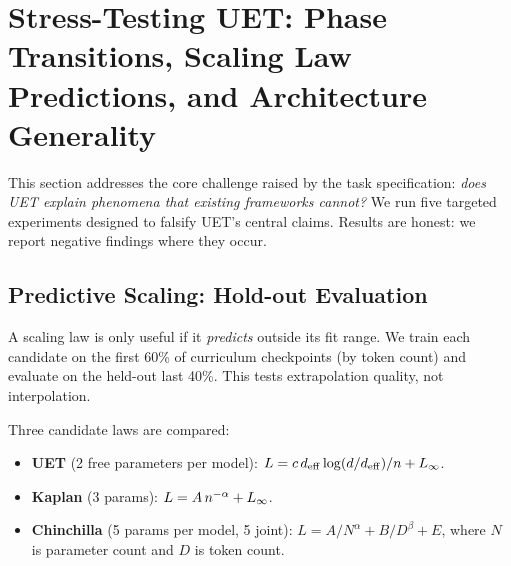 \section{Stress-Testing UET: Phase Transitions, Scaling Law Predictions, and Architecture Generality}
\label{sec:v3}

This section addresses the core challenge raised by the task specification:
\emph{does UET explain phenomena that existing frameworks cannot?}
We run five targeted experiments designed to falsify UET's central claims.
Results are honest: we report negative findings where they occur.

\subsection{Predictive Scaling: Hold-out Evaluation}
\label{sec:predictive}

A scaling law is only useful if it \emph{predicts} outside its fit range.
We train each candidate on the first 60\% of curriculum checkpoints
(by token count) and evaluate on the held-out last 40\%.
This tests extrapolation quality, not interpolation.

Three candidate laws are compared:

\begin{itemize}[leftmargin=1.5em,itemsep=2pt]
\item \textbf{UET} (2 free parameters per model):
  $L = c\,d_{\mathrm{eff}}\log(d/d_{\mathrm{eff}})/n + L_{\infty}$.
\item \textbf{Kaplan} \citep{kaplan2020scaling} (3 params):
  $L = A\,n^{-\alpha} + L_{\infty}$.
\item \textbf{Chinchilla} \citep{hoffmann2022chinchilla} (5 params per model, 5 joint):
  $L = A/N^{\alpha} + B/D^{\beta} + E$, where $N$ is parameter count and
  $D$ is token count.
\end{itemize}

